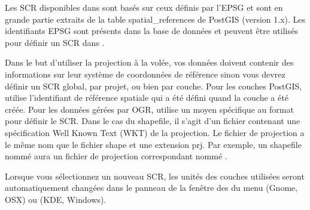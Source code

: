 Les SCR disponibles dans \qg sont basés sur ceux définis par l'EPSG et sont en grande partie extraits de la table spatial\_references de PostGIS (version 1.x). Les identifiants EPSG sont présents dans la base de données et peuvent être utilisés pour définir un SCR dans \qg. 

Dans le but d'utiliser la projection à la volée, vos données doivent contenir des informations sur leur système de coordonnées de référence sinon vous devrez définir un SCR global, par projet, ou bien par couche. Pour les couches PostGIS, \qg utilise l'identifiant de référence spatiale qui a été défini quand la couche a été créée. Pour les données gérées par OGR, \qg utilise un moyen spécifique au format pour définir le SCR. Dans le cas du shapefile, il s'agit d'un fichier contenant une spécification Well Known Text (WKT) de la projection. Le fichier de projection a le même nom que le fichier shape et une extension prj. Par exemple, un shapefile nommé  aura un fichier de projection correspondant nommé .


Lorsque vous sélectionnez un nouveau SCR, les unités des couches utilisées seront automatiquement changées dans le panneau  de la fenêtre des  du menu  (Gnome, OSX) ou  (KDE, Windows).

